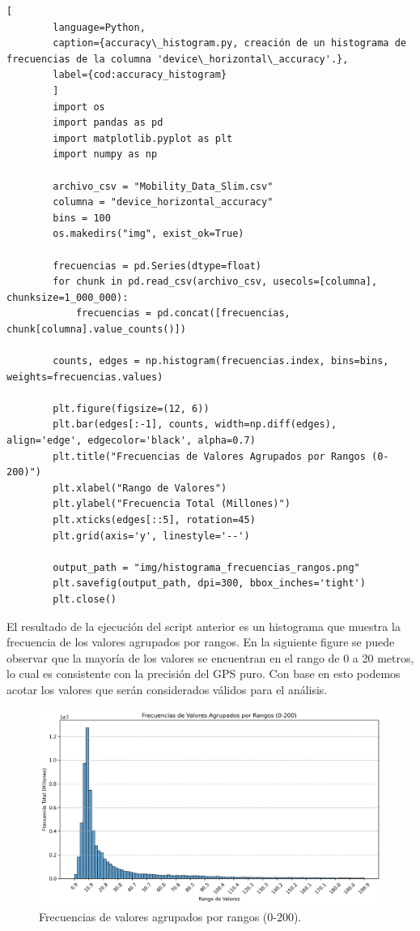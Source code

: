     \begin{lstlisting}[
        language=Python,
        caption={accuracy\_histogram.py, creación de un histograma de frecuencias de la columna 'device\_horizontal\_accuracy'.},
        label={cod:accuracy_histogram}
        ]
        import os
        import pandas as pd
        import matplotlib.pyplot as plt
        import numpy as np

        archivo_csv = "Mobility_Data_Slim.csv"
        columna = "device_horizontal_accuracy"  
        bins = 100 
        os.makedirs("img", exist_ok=True) 

        frecuencias = pd.Series(dtype=float)
        for chunk in pd.read_csv(archivo_csv, usecols=[columna], chunksize=1_000_000):
            frecuencias = pd.concat([frecuencias, chunk[columna].value_counts()])

        counts, edges = np.histogram(frecuencias.index, bins=bins, weights=frecuencias.values)

        plt.figure(figsize=(12, 6))
        plt.bar(edges[:-1], counts, width=np.diff(edges), align='edge', edgecolor='black', alpha=0.7)
        plt.title("Frecuencias de Valores Agrupados por Rangos (0-200)")
        plt.xlabel("Rango de Valores")
        plt.ylabel("Frecuencia Total (Millones)")
        plt.xticks(edges[::5], rotation=45) 
        plt.grid(axis='y', linestyle='--')

        output_path = "img/histograma_frecuencias_rangos.png"
        plt.savefig(output_path, dpi=300, bbox_inches='tight')
        plt.close()
    \end{lstlisting}

\noindent El resultado de la ejecución del script anterior es un histograma que muestra la frecuencia de los valores agrupados por rangos. En la siguiente figure se puede observar que la mayoría de los valores se encuentran en el rango de 0 a 20 metros, lo cual es consistente con la precisión del GPS puro. Con base en esto podemos acotar los valores que serán considerados válidos para el análisis.

\begin{figure}[H]
    \centering
    \includegraphics[width=\textwidth]{img/histograma_frecuencias_rangos.png}
    \caption{Frecuencias de valores agrupados por rangos (0-200).}
    \label{fig:accuracy_histogram}
\end{figure}

